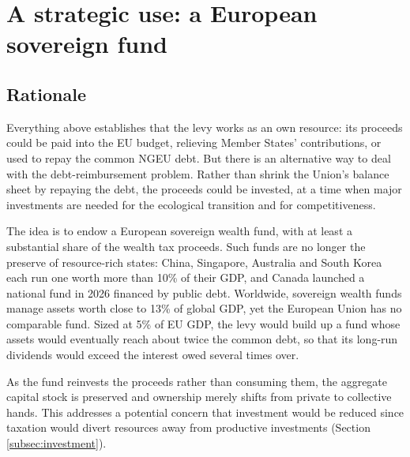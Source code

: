 \documentclass[../../main]{subfiles}
\begin{document}

\section{A strategic use: a European sovereign fund}
\label{sec:fund}

\subsection{Rationale}

Everything above establishes that the levy works as an own resource: its proceeds could be paid into the EU budget, relieving Member States' contributions, or used to repay the common NGEU debt. But 
there is an alternative 
way to deal with the debt-reimbursement problem. Rather than shrink the Union's balance sheet by repaying the debt, the proceeds could be invested, at a time when major investments are needed for the ecological transition and for competitiveness.

The idea is to endow a European sovereign wealth fund, with at least a substantial share of the wealth tax proceeds. Such funds are no longer the preserve of resource-rich states: China, Singapore, Australia and South Korea each run one worth more than 10\% of their GDP, %
and Canada launched a national fund in 2026 financed by public debt. %
Worldwide, sovereign wealth funds manage assets worth close to 13\% of global GDP, yet the European Union has no comparable fund. Sized at 5\% of EU GDP, the levy would build up a fund whose assets would eventually reach about twice the common debt, so that its long-run dividends would exceed the interest owed several times over. 

As the fund reinvests the proceeds rather than consuming them, the aggregate capital stock is preserved and ownership merely shifts from private to collective hands. This addresses a potential concern that investment would be reduced since taxation would divert resources away from productive investments (Section \ref{subsec:investment}).
\end{document}
